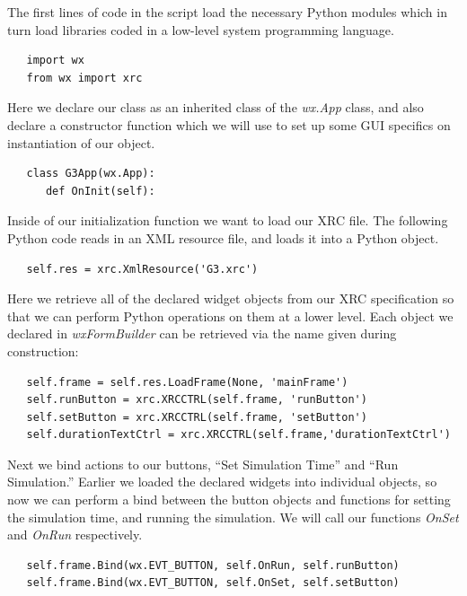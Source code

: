 \documentclass[12pt]{article}
\begin{document}
The first lines of code in the script load the necessary Python
modules which in turn load libraries coded in a low-level system
programming language.

{\footnotesize
  \resetlinenumber
  \linenumbers
\begin{verbatim}
   import wx
   from wx import xrc
\end{verbatim}
}

Here we declare our class as an inherited class of the {\it wx.App} class, 
and also declare a constructor function which we will use to set up 
some GUI specifics on instantiation of our object.

{\footnotesize
   \resetlinenumber[3]
   \linenumbers
 \begin{verbatim}
   class G3App(wx.App):
      def OnInit(self): 
 \end{verbatim}
}

Inside of our initialization function we want to load our XRC file.
The following Python code reads in an XML resource file, and loads it
into a Python object.

{\footnotesize
   \resetlinenumber[5]
   \linenumbers
 \begin{verbatim}
   self.res = xrc.XmlResource('G3.xrc')
 \end{verbatim}
}

Here we retrieve all of the declared widget objects from our XRC 
specification so that we can perform Python operations on them at a 
lower level. Each object we declared in {\it wxFormBuilder} can be retrieved 
via the name given during construction:

{\footnotesize
   \resetlinenumber[6]
   \linenumbers
 \begin{verbatim}
   self.frame = self.res.LoadFrame(None, 'mainFrame')
   self.runButton = xrc.XRCCTRL(self.frame, 'runButton')
   self.setButton = xrc.XRCCTRL(self.frame, 'setButton')
   self.durationTextCtrl = xrc.XRCCTRL(self.frame,'durationTextCtrl')
 \end{verbatim}
}

Next we bind actions to our buttons, ``Set Simulation Time'' and ``Run
Simulation.'' Earlier we loaded the declared widgets into individual
objects, so now we can perform a bind between the button objects and
functions for setting the simulation time, and running the simulation.
We will call our functions {\it OnSet} and {\it OnRun} respectively.

{\footnotesize
   \resetlinenumber[10]
   \linenumbers
 \begin{verbatim}
   self.frame.Bind(wx.EVT_BUTTON, self.OnRun, self.runButton)
   self.frame.Bind(wx.EVT_BUTTON, self.OnSet, self.setButton)
 \end{verbatim} 
}
\end{document}
